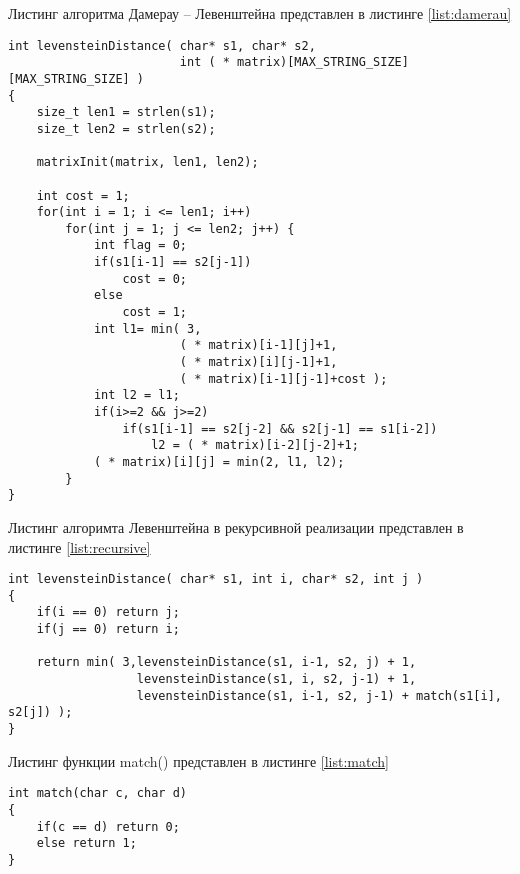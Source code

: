 Листинг алгоритма Дамерау -- Левенштейна представлен в листинге \ref{list:damerau}
\begin{lstlisting}[style=CStyle, caption={Damerau -- Levenstein algorithm},
                    label={list:damerau}]
int levensteinDistance( char* s1, char* s2,
                        int ( * matrix)[MAX_STRING_SIZE][MAX_STRING_SIZE] )
{
    size_t len1 = strlen(s1);
    size_t len2 = strlen(s2);

    matrixInit(matrix, len1, len2);

    int cost = 1;
    for(int i = 1; i <= len1; i++)
        for(int j = 1; j <= len2; j++) {
            int flag = 0;
            if(s1[i-1] == s2[j-1])
                cost = 0;
            else
                cost = 1;
            int l1= min( 3,
                        ( * matrix)[i-1][j]+1,
                        ( * matrix)[i][j-1]+1,
                        ( * matrix)[i-1][j-1]+cost );
            int l2 = l1;
            if(i>=2 && j>=2)
                if(s1[i-1] == s2[j-2] && s2[j-1] == s1[i-2])
                    l2 = ( * matrix)[i-2][j-2]+1;
            ( * matrix)[i][j] = min(2, l1, l2);
        }
}
\end{lstlisting}

Листинг алгоримта Левенштейна в рекурсивной реализации представлен в листинге \ref{list:recursive}
\begin{lstlisting}[style=CStyle, caption={ Recursive Levenstein algorithm},
                    label={list:recursive}]
int levensteinDistance( char* s1, int i, char* s2, int j )
{
    if(i == 0) return j;
    if(j == 0) return i;

    return min( 3,levensteinDistance(s1, i-1, s2, j) + 1,
                  levensteinDistance(s1, i, s2, j-1) + 1,
                  levensteinDistance(s1, i-1, s2, j-1) + match(s1[i], s2[j]) );
}
\end{lstlisting}

Листинг функции match() представлен в листинге \ref{list:match}
\begin{lstlisting}[style=CStyle, caption={Function match()},
                    label={list:match}]
int match(char c, char d)
{
    if(c == d) return 0;
    else return 1;
}
\end{lstlisting}
